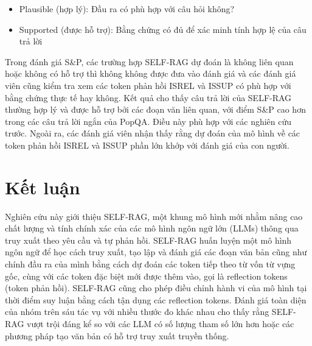 \documentclass{article}
\begin{document}
\begin{itemize}
    \item Plausible (hợp lý): Đầu ra có phù hợp với câu hỏi không?
    \item Supported (được hỗ trợ): Bằng chứng có đủ để xác minh tính hợp lệ của câu trả lời 
\end{itemize}

Trong đánh giá S\&P, các trường hợp SELF-RAG dự đoán là không liên quan hoặc không có hỗ trợ thì không không được đưa vào đánh giá và các đánh giá viên cũng kiểm tra xem các token phản hồi ISREL và ISSUP có phù hợp với bằng chứng thực tế hay không. Kết quả cho thấy câu trả lời của SELF-RAG thường hợp lý và được hỗ trợ bởi các đoạn văn liên quan, với điểm S\&P cao hơn trong các câu trả lời ngắn của PopQA. Điều này phù hợp với các nghiên cứu trước. Ngoài ra, các đánh giá viên nhận thấy rằng dự đoán của mô hình về các token phản hồi ISREL và ISSUP phần lớn khớp với đánh giá của con người. 


\section{Kết luận}
Nghiên cứu này giới thiệu SELF-RAG, một khung mô hình mới nhằm nâng cao chất lượng và tính chính xác của các mô hình ngôn ngữ lớn (LLMs) thông qua truy xuất theo yêu cầu và tự phản hồi. SELF-RAG huấn luyện một mô hình ngôn ngữ để học cách truy xuất, tạo lập và đánh giá các đoạn văn bản cũng như chính đầu ra của mình bằng cách dự đoán các token tiếp theo từ vốn từ vựng gốc, cùng với các token đặc biệt mới được thêm vào, gọi là reflection tokens (token phản hồi). SELF-RAG cũng cho phép điều chỉnh hành vi của mô hình tại thời điểm suy luận bằng cách tận dụng các reflection tokens. Đánh giá toàn diện của nhóm trên sáu tác vụ với nhiều thước đo khác nhau cho thấy rằng SELF-RAG vượt trội đáng kể so với các LLM có số lượng tham số lớn hơn hoặc các phương pháp tạo văn bản có hỗ trợ truy xuất truyền thống.

\printbibliography
\end{document}
